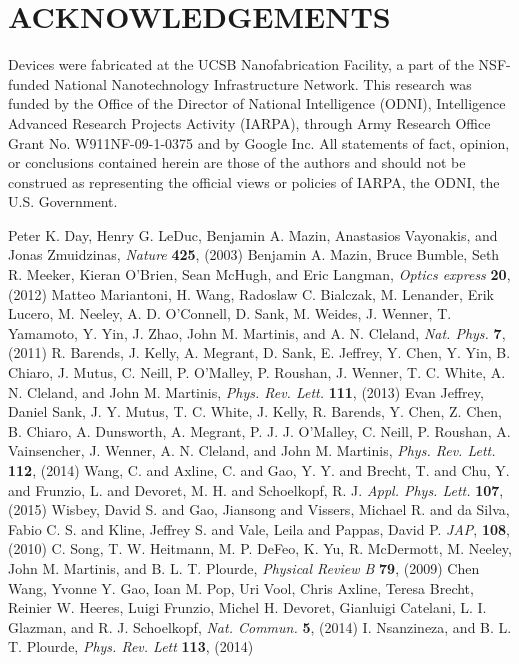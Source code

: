 \documentclass{report}
\begin{document}
\section*{ACKNOWLEDGEMENTS}%
Devices were fabricated at the UCSB Nanofabrication Facility, a part of the NSF-funded National Nanotechnology Infrastructure Network.  This research was funded by the Office of the Director of National Intelligence (ODNI), Intelligence Advanced Research Projects Activity (IARPA), through Army Research Office Grant No. W911NF-09-1-0375 and by Google Inc. All statements of fact, opinion, or conclusions contained herein are those of the authors and should not be construed as representing the official views or policies of IARPA, the ODNI, the U.S. Government.
\begin{thebibliography}{99}

  Peter K. Day,  Henry G. LeDuc,  Benjamin A. Mazin,  Anastasios Vayonakis, and  Jonas Zmuidzinas, \textit{Nature} \textbf{425},  (2003)
  Benjamin A. Mazin,  Bruce Bumble,  Seth R. Meeker,  Kieran O’Brien,  Sean McHugh, and  Eric Langman, \textit{Optics express} \textbf{20},  (2012)
  Matteo Mariantoni, H.  Wang,  Radoslaw C. Bialczak, M.  Lenander,  Erik Lucero, M.  Neeley, A. D.  O’Connell, D.  Sank, M.  Weides, J.  Wenner, T.  Yamamoto, Y.  Yin, J.  Zhao,  John M. Martinis, and A. N.  Cleland, \textit{Nat. Phys.} \textbf{7},  (2011)
 R.  Barends, J.  Kelly, A.  Megrant, D.  Sank, E.  Jeffrey, Y.  Chen, Y.  Yin, B.  Chiaro, J.  Mutus, C.  Neill, P.  O'Malley, P.  Roushan, J.  Wenner, T. C.  White, A. N.  Cleland, and  John M. Martinis, \textit{Phys. Rev. Lett.} \textbf{111},  (2013)
  Evan Jeffrey,  Daniel Sank, J. Y.  Mutus, T. C.  White, J.  Kelly, R.  Barends, Y.  Chen, Z.  Chen, B.  Chiaro, A.  Dunsworth, A.  Megrant, P. J. J.  O'Malley, C.  Neill, P.  Roushan, A.  Vainsencher, J.  Wenner, A. N.  Cleland, and  John M. Martinis, \textit{Phys. Rev. Lett.} \textbf{112},  (2014)
Wang, C. and Axline, C. and Gao, Y. Y. and Brecht, T. and Chu, Y. and Frunzio, L. and Devoret, M. H. and Schoelkopf, R. J. \textit{Appl. Phys. Lett.} \textbf{107},  (2015)
Wisbey, David S. and Gao, Jiansong and Vissers, Michael R. and da Silva, Fabio C. S. and Kline, Jeffrey S. and Vale, Leila and Pappas, David P. \textit{JAP}, \textbf{108},  (2010)
 C.  Song, T. W.  Heitmann, M. P.  DeFeo, K.  Yu, R.  McDermott, M.  Neeley,  John M. Martinis, and B. L. T.  Plourde, \textit{Physical Review B} \textbf{79},  (2009)
  Chen Wang,  Yvonne Y. Gao,  Ioan M. Pop,  Uri Vool,  Chris Axline,  Teresa Brecht,  Reinier W. Heeres,  Luigi Frunzio,  Michel H. Devoret,  Gianluigi Catelani, L. I.  Glazman, and R. J.  Schoelkopf, \textit{Nat. Commun.} \textbf{5},  (2014)
 I.  Nsanzineza, and B. L. T.  Plourde, \textit{Phys. Rev. Lett} \textbf{113},  (2014)


\end{thebibliography}
\end{document}
